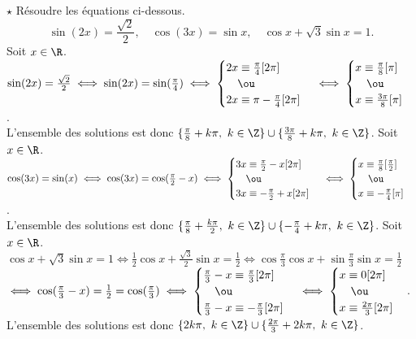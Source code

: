 \documentclass[11pt]{article}
\begin{document}
\pagebreak

\begin{ex}{$\star$}{}
    Résoudre les équations ci-dessous.
    \begin{equation*}
        \sin(2x)=\frac{\sqrt{2}}{2},\quad\cos(3x)=\sin x,\quad\cos x+\sqrt{3}\sin x=1.
    \end{equation*}
    \tcblower
     Soit $x\in\R$. $\sin(2x)=\frac{\sqrt{2}}{2}\iff\sin(2x)=\sin(\frac{\pi}{4})\iff\begin{cases}2x\equiv\frac{\pi}{4}[2\pi]\\\quad\ou\\2x\equiv\pi-\frac{\pi}{4}[2\pi]\end{cases}\iff\begin{cases}x\equiv\frac{\pi}{8}[\pi]\\\quad\ou\\x\equiv\frac{3\pi}{8}[\pi]\end{cases}$.\\
    L'ensemble des solutions est donc $\{\frac{\pi}{8}+k\pi,~k\in\Z\}\cup\{\frac{3\pi}{8}+k\pi,~k\in\Z\}$.\n
     Soit $x\in\R$. $\cos(3x)=\sin(x)\iff\cos(3x)=\cos(\frac{\pi}{2}-x)\iff\begin{cases}3x\equiv\frac{\pi}{2}-x[2\pi]\\\quad\ou\\3x\equiv-\frac{\pi}{2}+x[2\pi]\end{cases}\iff\begin{cases}x\equiv\frac{\pi}{8}[\frac{\pi}{2}]\\\quad\ou\\x\equiv-\frac{\pi}{4}[\pi]\end{cases}$.\\
    L'ensemble des solutions est donc $\{\frac{\pi}{8}+\frac{k\pi}{2},~k\in\Z\}\cup\{-\frac{\pi}{4}+k\pi,~k\in\Z\}$.\n
     Soit $x\in\R$. $\cos x+\sqrt{3}\sin x=1\iff\frac{1}{2}\cos x+\frac{\sqrt{3}}{2}\sin x=\frac{1}{2}\iff\cos\frac{\pi}{3}\cos x+\sin\frac{\pi}{3}\sin x=\frac{1}{2}$\\
    $\iff\cos(\frac{\pi}{3}-x)=\frac{1}{2}=\cos(\frac{\pi}{3})\iff\begin{cases}\frac{\pi}{3}-x\equiv\frac{\pi}{3}[2\pi]\\\quad\ou\\\frac{\pi}{3}-x\equiv-\frac{\pi}{3}[2\pi]\end{cases}\iff\begin{cases}x\equiv0[2\pi]\\\quad\ou\\ x\equiv\frac{2\pi}{3}[2\pi]\end{cases}$.\\
    L'ensemble des solutions est donc $\{2k\pi,~k\in\Z\}\cup\{\frac{2\pi}{3}+2k\pi,~k\in\Z\}$.
\end{ex}
\end{document}
